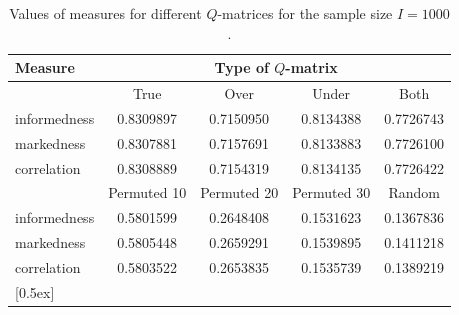 \documentclass[english]{pwr_wmat_praca_dyplomowa}
\theoremstyle{plain}
\numberwithin{theorem}{chapter}
\theoremstyle{definition}
\numberwithin{theorem}{chapter}
\begin{document}
	\begin{table}
		\centering
		\begin{tabular}{l c c c c} 
			\hline
			{\rule{0pt}{3ex}}Measure & \multicolumn{4}{c}{Type of $Q$-matrix} \\ [0.5ex]
			\hline
			{\rule{0pt}{3ex}}&True & Over & Under & Both \\\cmidrule{2-5}
			informedness & 0.8309897 & 0.7150950 & 0.8134388 & 0.7726743 \\ 
			markedness & 0.8307881 & 0.7157691 & 0.8133883 & 0.7726100 \\ 
			correlation & 0.8308889 & 0.7154319 & 0.8134135 & 0.7726422\\ 
			\hline
			{\rule{0pt}{3ex}}& Permuted 10 & Permuted 20 & Permuted 30 & Random \\\cmidrule{2-5}
			informedness & 0.5801599 & 0.2648408 & 0.1531623 & 0.1367836 \\ 
			markedness & 0.5805448 & 0.2659291 & 0.1539895 & 0.1411218 \\ 
			correlation & 0.5803522 & 0.2653835 & 0.1535739 & 0.1389219\\ 
			[0.5ex] 
			\hline 
		\end{tabular}
		\caption{Values of measures for different $Q$-matrices for the sample size $I=1000$.}
		\label{tab:confusion_matrix_values_qmat_1000} 
	\end{table}
	
\end{document}
